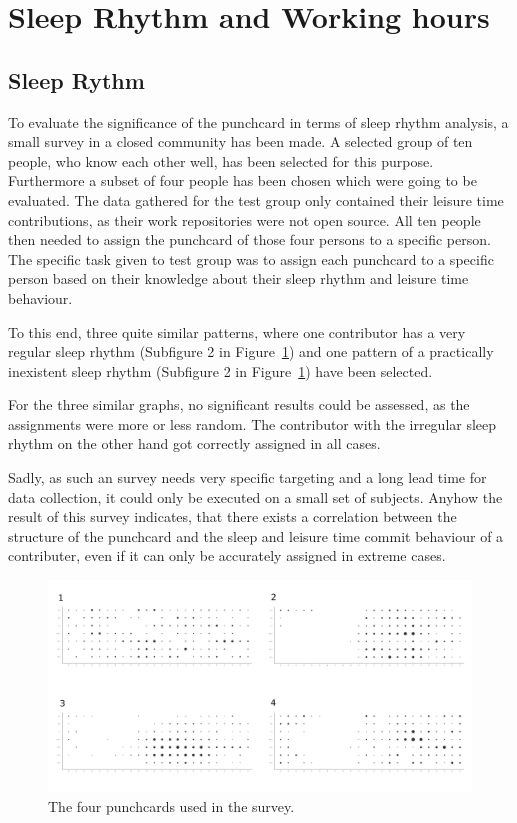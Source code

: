 \section{Sleep Rhythm and Working hours}

\subsection{Sleep Rythm}
To evaluate the significance of the punchcard in terms of sleep rhythm analysis, a small survey in a closed community has been made.
A selected group of ten people, who know each other well, has been selected for this purpose.
Furthermore a subset of four people has been chosen which were going to be evaluated.
The data gathered for the test group only contained their leisure time contributions, as their work repositories were not open source.
All ten people then needed to assign the punchcard of those four persons to a specific person.
The specific task given to test group was to assign each punchcard to a specific person based on their knowledge about their sleep rhythm and leisure time behaviour.

To this end, three quite similar patterns, where one contributor has a very regular sleep rhythm (Subfigure 2 in Figure~\ref{fig:punchcard-survey}) and one pattern of a practically inexistent sleep rhythm (Subfigure 2 in Figure~\ref{fig:punchcard-survey}) have been selected.

For the three similar graphs, no significant results could be assessed, as the assignments were more or less random.
The contributor with the irregular sleep rhythm on the other hand got correctly assigned in all cases.

Sadly, as such an survey needs very specific targeting and a long lead time for data collection, it could only be executed on a small set of subjects.
Anyhow the result of this survey indicates, that there exists a correlation between the structure of the punchcard and the sleep and leisure time commit behaviour of a contributer, even if it can only be accurately assigned in extreme cases.


\begin{figure}[H]
    \includegraphics[scale=0.16]{./graphs/analysis/survey_combined}
    \centering
    \caption{The four punchcards used in the survey.}\label{fig:punchcard-survey}
\end{figure}

